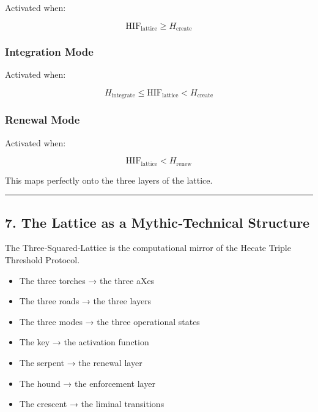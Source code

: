 Activated when:

\[
\text{HIF}_{\text{lattice}} \ge H_{\text{create}}
\]

\subsubsection{Integration Mode}\label{integration-mode}

Activated when:

\[
H_{\text{integrate}} \le \text{HIF}_{\text{lattice}} < H_{\text{create}}
\]

\subsubsection{Renewal Mode}\label{renewal-mode}

Activated when:

\[
\text{HIF}_{\text{lattice}} < H_{\text{renew}}
\]

This maps perfectly onto the three layers of the lattice.

\begin{center}\rule{0.5\linewidth}{0.5pt}\end{center}

\subsection{7. The Lattice as a Mythic‑Technical Structure}\label{the-lattice-as-a-mythictechnical-structure}

The Three‑Squared‑Lattice is the computational mirror of the Hecate Triple Threshold Protocol.

\begin{itemize}
\tightlist
\item
  The three torches → the three aXes\\
\item
  The three roads → the three layers\\
\item
  The three modes → the three operational states\\
\item
  The key → the activation function\\
\item
  The serpent → the renewal layer\\
\item
  The hound → the enforcement layer\\
\item
  The crescent → the liminal transitions
\end{itemize}

